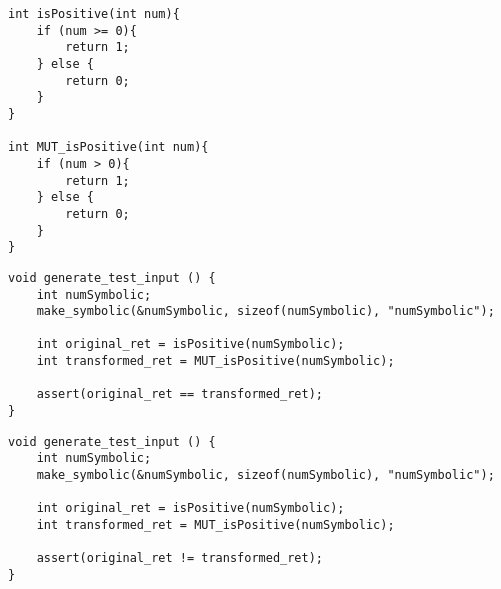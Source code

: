 
\begin{lstlisting}[style=CStyle, caption=isPositive and MUT\_isPositive functions, label=function]
int isPositive(int num){
	if (num >= 0){
		return 1;
	} else {
		return 0;
	}
}

int MUT_isPositive(int num){
	if (num > 0){
		return 1;
	} else {
		return 0;
	}
}

\end{lstlisting}

\begin{lstlisting}[style=CStyle, caption=Holling's approach for test case generation., label=example]
void generate_test_input () { 
	int numSymbolic; 
	make_symbolic(&numSymbolic, sizeof(numSymbolic), "numSymbolic"); 
 	
 	int original_ret = isPositive(numSymbolic); 
	int transformed_ret = MUT_isPositive(numSymbolic); 
 
	assert(original_ret == transformed_ret); 
}
\end{lstlisting}

\begin{lstlisting}[style=CStyle, caption=Test case generation with assertion that reflects the desired behaviour., label=exampleAssume]
void generate_test_input () { 
	int numSymbolic; 
	make_symbolic(&numSymbolic, sizeof(numSymbolic), "numSymbolic"); 
 	
 	int original_ret = isPositive(numSymbolic); 
	int transformed_ret = MUT_isPositive(numSymbolic); 
 
	assert(original_ret != transformed_ret); 
}
\end{lstlisting}

%
% 	
%	

